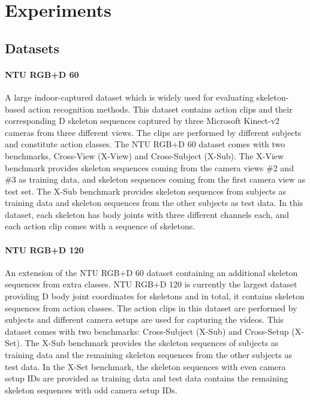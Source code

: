 \documentclass[journal]{IEEEtran}
\theoremstyle{definition}
\begin{document}
\section{Experiments} \label{sec:experiments}

\subsection{Datasets} \label{sec:datasets}
\paragraph{NTU RGB+D 60~\textnormal{\cite{Shahroudy_2016_NTURGBD}}}
A large indoor-captured dataset which is widely used for evaluating skeleton-based action recognition methods. This dataset contains  action clips and their corresponding D skeleton sequences captured by three Microsoft Kinect-v2 cameras from three different views. The clips are performed by  different subjects and constitute  action classes. The NTU RGB+D 60 dataset comes with two benchmarks, Cross-View (X-View) and Cross-Subject (X-Sub). The X-View benchmark provides  skeleton sequences coming from the camera views \#2 and \#3 as training data, and  skeleton sequences coming from the first camera view as test set. The X-Sub benchmark provides  skeleton sequences from  subjects as training data and  skeleton sequences from the other  subjects as test data. In this dataset, each skeleton has  body joints with three different channels each, and each action clip comes with a sequence of  skeletons. 

\paragraph{NTU RGB+D 120~\textnormal{\cite{Liu_2019_NTURGBD120}}}
An extension of the NTU RGB+D 60 dataset containing an additional  skeleton sequences from extra  classes. NTU RGB+D 120 is currently the largest dataset providing D body joint coordinates for skeletons and in total, it contains  skeleton sequences from  action classes. The action clips in this dataset are performed by  subjects and  different camera setups are used for capturing the videos. This dataset comes with two benchmarks: Cross-Subject (X-Sub) and Cross-Setup (X-Set). The X-Sub benchmark provides the skeleton sequences of  subjects as training data and the remaining skeleton sequences from the other  subjects as test data. 
In the X-Set benchmark, the skeleton sequences with even camera setup IDs are provided as training data and test data contains the remaining skeleton sequences with odd camera setup IDs.
\end{document}
